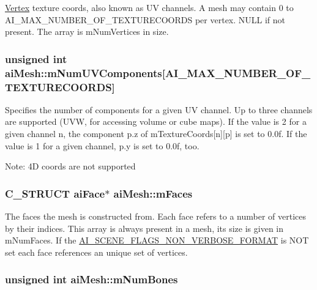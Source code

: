 \hyperlink{struct_vertex}{Vertex} texture coords, also known as UV channels. A mesh may contain 0 to AI\_\-MAX\_\-NUMBER\_\-OF\_\-TEXTURECOORDS per vertex. NULL if not present. The array is mNumVertices in size. \hypertarget{structai_mesh_635c631a6e66d32989d6b25b2a892d86}{
\subsubsection[mNumUVComponents]{\setlength{\rightskip}{0pt plus 5cm}unsigned int {\bf aiMesh::mNumUVComponents}\mbox{[}AI\_\-MAX\_\-NUMBER\_\-OF\_\-TEXTURECOORDS\mbox{]}}}
\label{structai_mesh_635c631a6e66d32989d6b25b2a892d86}


Specifies the number of components for a given UV channel. Up to three channels are supported (UVW, for accessing volume or cube maps). If the value is 2 for a given channel n, the component p.z of mTextureCoords\mbox{[}n\mbox{]}\mbox{[}p\mbox{]} is set to 0.0f. If the value is 1 for a given channel, p.y is set to 0.0f, too. \begin{Desc}
\item[Note:]4D coords are not supported \end{Desc}
\hypertarget{structai_mesh_5a65fbc7fdea7f8d36f39047425ece07}{
\subsubsection[mFaces]{\setlength{\rightskip}{0pt plus 5cm}C\_\-STRUCT {\bf aiFace}$\ast$ {\bf aiMesh::mFaces}}}
\label{structai_mesh_5a65fbc7fdea7f8d36f39047425ece07}


The faces the mesh is constructed from. Each face refers to a number of vertices by their indices. This array is always present in a mesh, its size is given in mNumFaces. If the \hyperlink{scene_8h_e17f4a0adb51e554db9575cc4e1126f9}{AI\_\-SCENE\_\-FLAGS\_\-NON\_\-VERBOSE\_\-FORMAT} is NOT set each face references an unique set of vertices. \hypertarget{structai_mesh_0f9d5425b6300e32a842a94f943fd79e}{
\subsubsection[mNumBones]{\setlength{\rightskip}{0pt plus 5cm}unsigned int {\bf aiMesh::mNumBones}}}
\label{structai_mesh_0f9d5425b6300e32a842a94f943fd79e}


